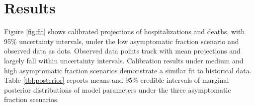 \documentclass[11pt]{article}
\newcommand{\comments}[1]{[\textcolor{red}{#1}]}
\newcommand{\ZLcomment}[1]{[\textcolor{red}{Richard: #1}]}
\begin{document}








\section{Results}


Figure \ref{fig:fit} shows calibrated projections of hospitalizations and deaths, with 95\% uncertainty intervals, under the low asymptomatic fraction scenario and observed data as dots.  Observed data points track with mean projections and largely fall within uncertainty intervals.  Calibration results under medium and high asymptomatic fraction scenarios demonstrate a similar fit to historical data.  
Table \ref{tbl:posterior} reports means and 95\% credible intervals of marginal posterior distributions of model parameters under the three asymptomatic fraction scenarios.
\end{document}
